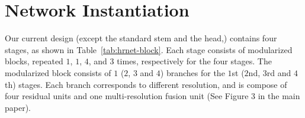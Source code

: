 \documentclass[10pt,journal,compsoc]{IEEEtran}
\begin{document}
{\small


}














\ifCLASSOPTIONcaptionsoff
  \newpage
\fi

\appendices
\onecolumn
\section{Network Instantiation}
Our current design (except the standard stem and the head,)
contains four stages, as shown in Table~\ref{tab:hrnet-block}.
Each stage consists of modularized blocks,
repeated $1$, $1$, $4$, and $3$ times,
respectively for the four stages.
The modularized block consists of $1$ ($2$, $3$ and $4$) branches
for the $1$st ($2$nd, $3$rd and $4$th) stages.
Each branch corresponds to different resolution,
and is compose of four residual units and one multi-resolution fusion unit (See Figure {\color{red}3} in the main paper).

\newcommand{\blocka}[3]{\multirow{3}{*}{
 $\left[\begin{array}{c}{3\times3, #1}\\[-.1em] {3\times3, #1} \end{array}
\right]
\times#2 
\times#3$
}
}


\newcommand{\blockb}[3]{\multirow{3}{*}{\(\left[\begin{array}{c}{1\times1, #2}\\[-.1em] {3\times3, #2}\\[-.1em] {1\times1, #1}\end{array}\right]\)
$\times$#3}
}
\end{document}
